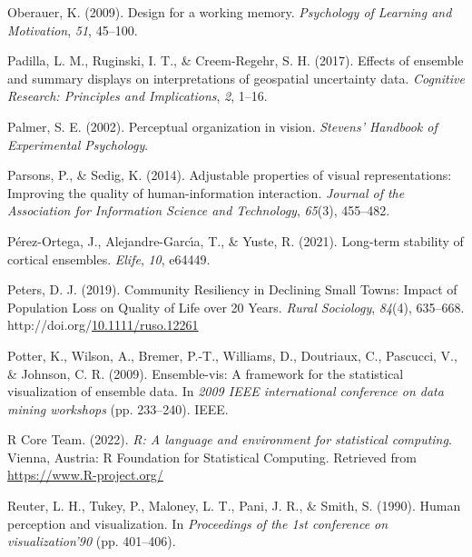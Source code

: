 \documentclass[print]{nuthesis}
\newlength{\cslhangindent}
\newenvironment{CSLReferences}[2]%
{\setlength{\parindent}{0pt}%
\everypar{\setlength{\hangindent}{\cslhangindent}}\ignorespaces}%
{\par}
\begin{document}
\begin{CSLReferences}{1}{0}
\leavevmode{}%
Oberauer, K. (2009). Design for a working memory. \emph{Psychology of Learning and Motivation}, \emph{51}, 45--100.

\leavevmode{}%
Padilla, L. M., Ruginski, I. T., \& Creem-Regehr, S. H. (2017). Effects of ensemble and summary displays on interpretations of geospatial uncertainty data. \emph{Cognitive Research: Principles and Implications}, \emph{2}, 1--16.

\leavevmode{}%
Palmer, S. E. (2002). Perceptual organization in vision. \emph{Stevens' Handbook of Experimental Psychology}.

\leavevmode{}%
Parsons, P., \& Sedig, K. (2014). Adjustable properties of visual representations: Improving the quality of human-information interaction. \emph{Journal of the Association for Information Science and Technology}, \emph{65}(3), 455--482.

\leavevmode{}%
Pérez-Ortega, J., Alejandre-Garcı́a, T., \& Yuste, R. (2021). Long-term stability of cortical ensembles. \emph{Elife}, \emph{10}, e64449.

\leavevmode{}%
Peters, D. J. (2019). Community {Resiliency} in {Declining} {Small} {Towns}: {Impact} of {Population} {Loss} on {Quality} of {Life} over 20 {Years}. \emph{Rural Sociology}, \emph{84}(4), 635--668. http://doi.org/\href{https://doi.org/10.1111/ruso.12261}{10.1111/ruso.12261}

\leavevmode{}%
Potter, K., Wilson, A., Bremer, P.-T., Williams, D., Doutriaux, C., Pascucci, V., \& Johnson, C. R. (2009). Ensemble-vis: A framework for the statistical visualization of ensemble data. In \emph{2009 IEEE international conference on data mining workshops} (pp. 233--240). IEEE.

\leavevmode{}%
R Core Team. (2022). \emph{R: A language and environment for statistical computing}. Vienna, Austria: R Foundation for Statistical Computing. Retrieved from \url{https://www.R-project.org/}

\leavevmode{}%
Reuter, L. H., Tukey, P., Maloney, L. T., Pani, J. R., \& Smith, S. (1990). Human perception and visualization. In \emph{Proceedings of the 1st conference on visualization'90} (pp. 401--406).


\end{CSLReferences}
\end{document}
